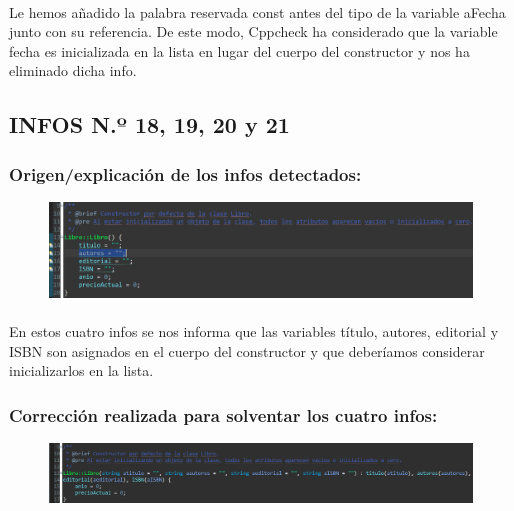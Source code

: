 			\paragraph{}Le hemos añadido la palabra reservada const antes del tipo de la variable aFecha junto con su referencia. De este modo, Cppcheck ha considerado que la variable fecha es inicializada en la lista en lugar del cuerpo del constructor y nos ha eliminado dicha info.
			
	\subsection{INFOS N.º 18, 19, 20 y 21}
	
		\subsubsection{Origen/explicación de los infos detectados:}
		
			\begin{figure}[H]
				\centering
				\includegraphics[scale=0.55]{img/esteban26.png}
				\label{esteban26}
			\end{figure}
		
			\paragraph{}En estos cuatro infos se nos informa que las variables título, autores, editorial y ISBN son asignados en el cuerpo del constructor y que deberíamos considerar inicializarlos en la lista.
			
		\subsubsection{Corrección realizada para solventar los cuatro infos:}
		
			\begin{figure}[H]
				\centering
				\includegraphics[scale=0.55]{img/esteban27.png}
				\label{esteban27}
			\end{figure}
		
